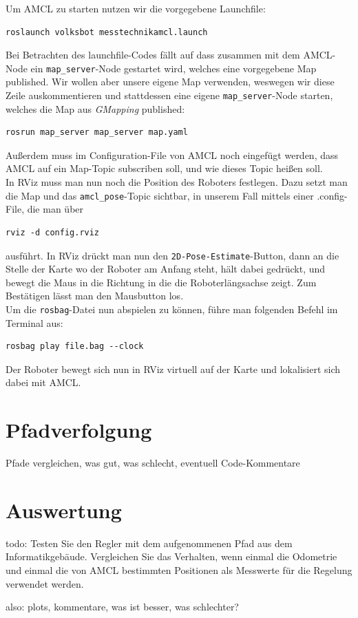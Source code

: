 \documentclass[11pt,a4paper]{article}
\begin{document}
Um AMCL zu starten nutzen wir die vorgegebene Launchfile:
\begin{verbatim}
roslaunch volksbot messtechnikamcl.launch
\end{verbatim}
Bei Betrachten des launchfile-Codes fällt auf dass zusammen mit dem AMCL-Node ein \verb|map_server|-Node gestartet
wird, welches eine vorgegebene Map published. Wir wollen aber unsere eigene Map verwenden, weswegen wir diese Zeile
auskommentieren und stattdessen eine eigene \verb|map_server|-Node starten, welches die Map aus \textit{GMapping}
published: \begin{verbatim}
rosrun map_server map_server map.yaml
\end{verbatim}
Außerdem muss im Configuration-File von AMCL noch eingefügt werden, dass AMCL auf ein Map-Topic subscriben soll,
und wie dieses Topic heißen soll. \\
In RViz muss man nun noch die Position des Roboters festlegen. Dazu setzt man die Map und das \verb|amcl_pose|-Topic
sichtbar, in unserem Fall mittels einer .config-File, die man über \begin{verbatim}
rviz -d config.rviz
\end{verbatim}
ausführt.
In RViz drückt man nun den \verb|2D-Pose-Estimate|-Button, dann an die Stelle der Karte wo der Roboter am Anfang steht,
hält dabei gedrückt, und bewegt die Maus in die Richtung in die die Roboterlängsachse zeigt. Zum Bestätigen
lässt man den Mausbutton los. \\
Um die \texttt{rosbag}-Datei nun abspielen zu können, führe man folgenden Befehl im Terminal aus:
\begin{verbatim}
rosbag play file.bag --clock
\end{verbatim}
Der Roboter bewegt sich nun in RViz virtuell auf der Karte und lokalisiert sich dabei mit AMCL.



\section{Pfadverfolgung}
Pfade vergleichen, was gut, was schlecht, eventuell Code-Kommentare 


\section{Auswertung}
todo: 
Testen Sie den Regler mit dem aufgenommenen Pfad aus dem Informatikgebäude. Vergleichen Sie das Verhalten, wenn einmal die Odometrie und einmal die von AMCL bestimmten
Positionen als Messwerte für die Regelung verwendet werden.

also: plots, kommentare, was ist besser, was schlechter?

\end{document}
